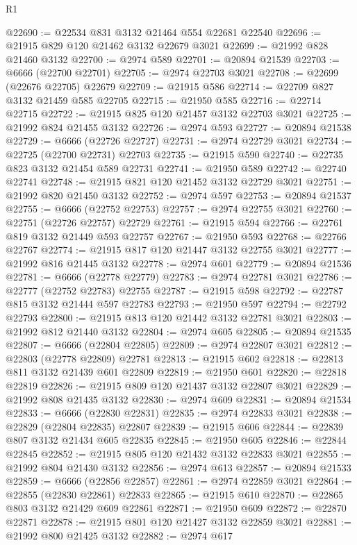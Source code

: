 \begin{lexlean}{R1}
\begin{coremodule}
@22690 := @22534 @831 @3132 @21464 @554 @22681 @22540
@22696 := @21915 @829 @120 @21462 @3132 @22679 @3021
@22699 := @21992 @828 @21460 @3132
@22700 := @2974 @589
@22701 := @20894 @21539
@22703 := @6666 (@22700 @22701)
@22705 := @2974 @22703 @3021
@22708 := @22699 (@22676 @22705) @22679
@22709 := @21915 @586
@22714 := @22709 @827 @3132 @21459 @585 @22705
@22715 := @21950 @585
@22716 := @22714 @22715
@22722 := @21915 @825 @120 @21457 @3132 @22703 @3021
@22725 := @21992 @824 @21455 @3132
@22726 := @2974 @593
@22727 := @20894 @21538
@22729 := @6666 (@22726 @22727)
@22731 := @2974 @22729 @3021
@22734 := @22725 (@22700 @22731) @22703
@22735 := @21915 @590
@22740 := @22735 @823 @3132 @21454 @589 @22731
@22741 := @21950 @589
@22742 := @22740 @22741
@22748 := @21915 @821 @120 @21452 @3132 @22729 @3021
@22751 := @21992 @820 @21450 @3132
@22752 := @2974 @597
@22753 := @20894 @21537
@22755 := @6666 (@22752 @22753)
@22757 := @2974 @22755 @3021
@22760 := @22751 (@22726 @22757) @22729
@22761 := @21915 @594
@22766 := @22761 @819 @3132 @21449 @593 @22757
@22767 := @21950 @593
@22768 := @22766 @22767
@22774 := @21915 @817 @120 @21447 @3132 @22755 @3021
@22777 := @21992 @816 @21445 @3132
@22778 := @2974 @601
@22779 := @20894 @21536
@22781 := @6666 (@22778 @22779)
@22783 := @2974 @22781 @3021
@22786 := @22777 (@22752 @22783) @22755
@22787 := @21915 @598
@22792 := @22787 @815 @3132 @21444 @597 @22783
@22793 := @21950 @597
@22794 := @22792 @22793
@22800 := @21915 @813 @120 @21442 @3132 @22781 @3021
@22803 := @21992 @812 @21440 @3132
@22804 := @2974 @605
@22805 := @20894 @21535
@22807 := @6666 (@22804 @22805)
@22809 := @2974 @22807 @3021
@22812 := @22803 (@22778 @22809) @22781
@22813 := @21915 @602
@22818 := @22813 @811 @3132 @21439 @601 @22809
@22819 := @21950 @601
@22820 := @22818 @22819
@22826 := @21915 @809 @120 @21437 @3132 @22807 @3021
@22829 := @21992 @808 @21435 @3132
@22830 := @2974 @609
@22831 := @20894 @21534
@22833 := @6666 (@22830 @22831)
@22835 := @2974 @22833 @3021
@22838 := @22829 (@22804 @22835) @22807
@22839 := @21915 @606
@22844 := @22839 @807 @3132 @21434 @605 @22835
@22845 := @21950 @605
@22846 := @22844 @22845
@22852 := @21915 @805 @120 @21432 @3132 @22833 @3021
@22855 := @21992 @804 @21430 @3132
@22856 := @2974 @613
@22857 := @20894 @21533
@22859 := @6666 (@22856 @22857)
@22861 := @2974 @22859 @3021
@22864 := @22855 (@22830 @22861) @22833
@22865 := @21915 @610
@22870 := @22865 @803 @3132 @21429 @609 @22861
@22871 := @21950 @609
@22872 := @22870 @22871
@22878 := @21915 @801 @120 @21427 @3132 @22859 @3021
@22881 := @21992 @800 @21425 @3132
@22882 := @2974 @617

\end{coremodule}
\end{lexlean}
